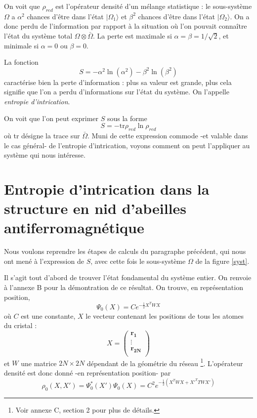 \documentclass[a4paper, french]{report}
\newcommand{\ket}[1]{\ensuremath{|#1\rangle}\xspace}
\newcommand{\pos}[1]{\ensuremath{\mathbf{r_{#1}}}\xspace}
\newcommand{\om}{\ensuremath{\Omega}\xspace}
\newcommand{\bom}{\ensuremath{\bar{\Omega}}\xspace}
\newcommand{\1}{\ensuremath{\ket{\om_1\bom_1}}\xspace}
\newcommand{\2}{\ensuremath{\ket{\om_2\bom_2}}\xspace}
\newcommand{\dens}{\ensuremath{\rho_0}\xspace}
\newcommand{\dred}{\ensuremath{\rho_{red}}\xspace}
\newcommand{\tr}{\text{tr}}
\begin{document}
On voit que \dred est l'opérateur densité d'un mélange statistique : le sous-système \om a $\alpha^2$ chances d'être dans l'état $\ket{\om_1}$ et $\beta^2$ chances d'être dans l'état $\ket{\om_2}$. On a donc perdu de l'information par rapport à la situation où l'on pouvait connaître l'état du système total $\om \otimes \bom$. La perte est maximale si $\alpha=\beta=1/\sqrt{2}$, et minimale si $\alpha=0$ ou $\beta=0$.

La fonction 
\[
	S=-\alpha^2\ln(\alpha^2)-\beta^2\ln(\beta^2)
\]
caractérise bien la perte d'information : plus sa valeur est grande, plus cela signifie que l'on a perdu d'informations sur l'état du système. On l'appelle \emph{entropie d'intrication}.

On voit que l'on peut exprimer $S$ sous la forme 
\begin{equation}
	S=-\tr \dred \ln \dred
\end{equation}
où tr désigne la trace sur \bom.
Muni de cette expression commode -et valable dans le cas général- de l'entropie d'intrication, voyons comment on peut l'appliquer au système qui nous intéresse.

\section{Entropie d'intrication dans la structure en nid d'abeilles antiferromagnétique}
\label{sec:entnidabeilles}
Nous voulons reprendre les étapes de calculs du paragraphe précédent, qui nous ont mené à l'expression de $S$, avec cette fois le sous-système \om de la figure \ref{syst}.

Il s'agit tout d'abord de trouver l'état fondamental du système entier. On renvoie à l'annexe B pour la démontration de ce résultat. On trouve, en représentation position,
\begin{equation}
\label{eq:fond}
	\Psi_0(X)=C e^{-\frac{1}{2}X^TWX}
\end{equation}
où $C$ est une constante, $X$ le vecteur contenant les positions de tous les atomes du cristal :
\[
	X=
	\begin{pmatrix}
	\pos{1}\\
	\vdots\\
	\pos{2N}\\
	\end{pmatrix}
\]
et $W$ une matrice $2N\times 2N$ dépendant de la géométrie du réseau \footnote{Voir annexe C, section 2 pour plus de détails.}.
L'opérateur densité est donc donné -en représentation position- par
\begin{equation}
	\dens(X,X')=\Psi_0^*(X')\Psi_0(X)=C^2 e^{-\frac{1}{2}(X^TWX+X'^TTWX')}
\end{equation}
\end{document}
